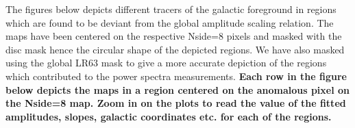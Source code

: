 \documentclass[12pt]{article}
\begin{document}
The figures below depicts different tracers of the galactic foreground in regions which are found to be deviant from the global amplitude scaling relation. The maps have been centered on the respective Nside=8 pixels and masked with the disc mask hence the circular shape of the depicted regions. We have also masked using the global LR63 mask to give a more accurate depiction of the regions which contributed to the power spectra measurements. {\bf Each row in the figure below depicts the maps in a region centered on the anomalous pixel on the Nside=8 map. Zoom in on the plots to read the value of the fitted amplitudes, slopes, galactic coordinates etc. for each of the regions.}
\begin{figure}[!h]
 \hspace{-0.2cm}
 \hspace{-0.2cm}
 \hspace{-0.2cm}
 \hspace{-0.2cm}
 \hspace{-0.2cm}
 \hspace{-0.2cm}
 \hspace{-0.2cm}
 \hspace{-0.2cm}
 \hspace{-0.2cm}
 \hspace{-0.2cm}
 \hspace{-0.2cm}

\end{figure}
\end{document}
